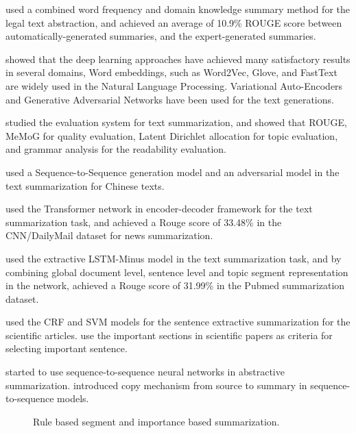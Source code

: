 \documentclass[11pt,a4paper]{article}
\begin{document}
\citet{polsley2016casesummarizer} used a combined word frequency and domain knowledge summary method for the legal text abstraction,
and achieved an average of 10.9\% ROUGE score between automatically-generated summaries, and the expert-generated summaries.

\citet{iqbal2020survey} showed that the deep learning approaches have achieved many satisfactory results in several domains,
Word embeddings, such as Word2Vec, Glove, and FastText are widely used in the Natural Language Processing.
Variational Auto-Encoders and Generative Adversarial Networks have been used for the text generations.

\citet{litvak2019easy} studied the evaluation system for text summarization,
and showed that ROUGE, MeMoG for quality evaluation, Latent Dirichlet allocation for topic evaluation,
and grammar analysis for the readability evaluation.

\citet{deng2020two} used a Sequence-to-Sequence generation model and an adversarial model in the text summarization for Chinese texts.

\citet{zhang2019pretraining} used the Transformer network in encoder-decoder framework for the text summarization task, and
achieved a Rouge score of 33.48\% in the CNN/DailyMail dataset for news summarization.

\citet{xiao2019extractive} used the extractive LSTM-Minus model in the text summarization task, and by combining
global document level, sentence level and topic segment representation in the network, achieved a Rouge score of 31.99\%
in the Pubmed summarization dataset.

\citet{liakata2013discourse} used the CRF and SVM models for the sentence extractive summarization for the scientific articles.
\citet{cohan2015scientific} use the important sections in scientific papers as criteria for selecting important sentence.

\citet{sutskever2013importance} started to use sequence-to-sequence neural networks in abstractive summarization.
\citet{vinyals2015pointer} introduced copy mechanism from source to summary in sequence-to-sequence models.

\begin{figure*}
\begin{center}
\end{center}
   \caption{Rule based segment and importance based summarization.}
\label{fig:short}
\end{figure*}
\end{document}
